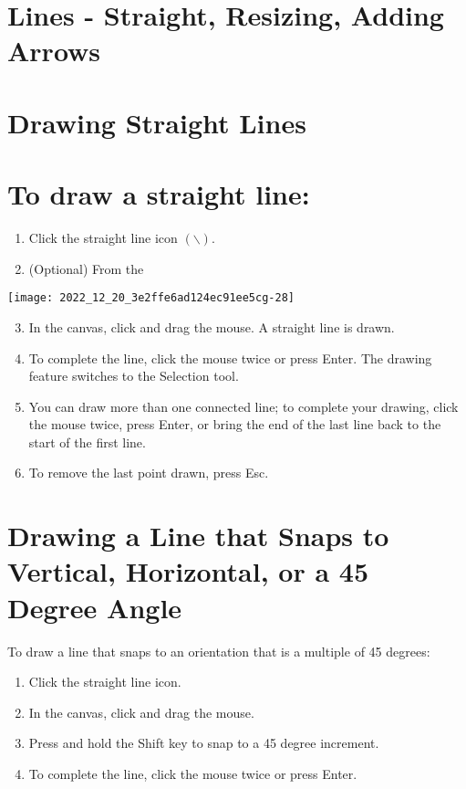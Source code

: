 \section{Lines - Straight, Resizing, Adding Arrows}
\section{Drawing Straight Lines}
\section{To draw a straight line:}
\begin{enumerate}
  \item Click the straight line icon $(\backslash)$.

  \item (Optional) From the

\end{enumerate}

\begin{center}
\texttt{[image: 2022\_12\_20\_3e2ffe6ad124ec91ee5cg-28]}
\end{center}

\begin{enumerate}
  \setcounter{enumi}{2}
  \item In the canvas, click and drag the mouse. A straight line is drawn.

  \item To complete the line, click the mouse twice or press Enter. The drawing feature switches to the Selection tool.

  \item You can draw more than one connected line; to complete your drawing, click the mouse twice, press Enter, or bring the end of the last line back to the start of the first line.

  \item To remove the last point drawn, press Esc.

\end{enumerate}

\section{Drawing a Line that Snaps to Vertical, Horizontal, or a 45 Degree Angle}
To draw a line that snaps to an orientation that is a multiple of 45 degrees:

\begin{enumerate}
  \item Click the straight line icon.

  \item In the canvas, click and drag the mouse.

  \item Press and hold the Shift key to snap to a 45 degree increment.

  \item To complete the line, click the mouse twice or press Enter.

\end{enumerate}

